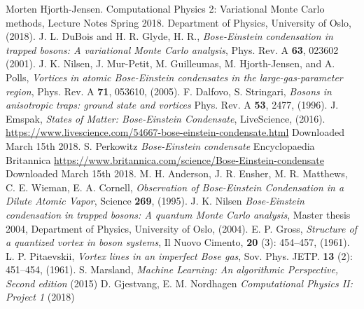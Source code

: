 \documentclass[norsk,a4paper,12pt]{article}
\begin{document}
\begingroup
\renewcommand{\section}[2]{}
\begin{thebibliography}{}
	Morten Hjorth-Jensen.
	Computational Physics 2: Variational Monte Carlo methods, Lecture Notes Spring 2018.
	Department of Physics, University of Oslo,
	(2018).
	J. L. DuBois and H. R. Glyde, H. R., \emph{Bose-Einstein condensation in trapped bosons: A variational Monte Carlo analysis}, Phys. Rev. A \textbf{63}, 023602 (2001).
	J. K. Nilsen,  J. Mur-Petit, M. Guilleumas, M. Hjorth-Jensen, and A. Polls, \emph{Vortices in atomic Bose-Einstein condensates in the large-gas-parameter region}, Phys. Rev. A \textbf{71}, 053610, (2005).
	F. Dalfovo, S. Stringari, \emph{Bosons in anisotropic traps: ground state and vortices} Phys. Rev. A \textbf{53}, 2477, (1996).
	J. Emspak, \emph{States of Matter: Bose-Einstein Condensate}, LiveScience, (2016).
	\url{https://www.livescience.com/54667-bose-einstein-condensate.html}
	Downloaded March 15th 2018.
	S. Perkowitz \emph{Bose-Einstein condensate} Encyclopaedia Britannica 
	\url{https://www.britannica.com/science/Bose-Einstein-condensate}
	Downloaded March 15th 2018.
	M. H. Anderson, J. R. Ensher, M. R. Matthews, C. E. Wieman, E. A. Cornell, \emph{Observation of Bose-Einstein Condensation in a Dilute Atomic Vapor}, Science \textbf{269}, (1995).
	J. K. Nilsen \emph{Bose-Einstein condensation in trapped bosons: A quantum Monte Carlo analysis}, Master thesis 2004, Department of Physics, University of Oslo, (2004). 
	E. P. Gross, \emph{Structure of a quantized vortex in boson systems}, Il Nuovo Cimento, \textbf{20} (3): 454–457, (1961).
	L. P. Pitaevskii, \emph{Vortex lines in an imperfect Bose gas}, Sov. Phys. JETP. \textbf{13} (2): 451–454, (1961).
	S. Marsland, \emph{Machine Learning: An algorithmic Perspective, Second edition} (2015)
	 D. Gjestvang, E. M. Nordhagen \emph{Computational Physics II: Project 1} (2018)
	
	
\end{thebibliography}
\endgroup
\end{document}

